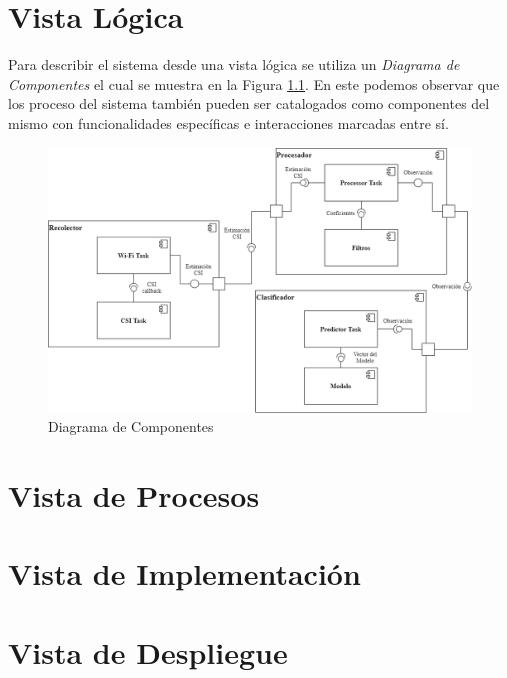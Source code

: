\documentclass{scrreprt}
\begin{document}
\chapter{Vista Lógica}
Para describir el sistema desde una vista lógica se utiliza un \emph{Diagrama de Componentes} el cual se muestra en la Figura \ref{fig:componentes}. En este podemos observar que los proceso del sistema también pueden ser catalogados como componentes del mismo con funcionalidades específicas e interacciones marcadas entre sí. 

\begin{figure}[h!]
    \centering
    \includegraphics[scale = 0.39]{images/component.png}
    \caption{Diagrama de Componentes}
    \label{fig:componentes}
\end{figure}

\chapter{Vista de Procesos}

\chapter{Vista de Implementación}

\chapter{Vista de Despliegue}
\end{document}
